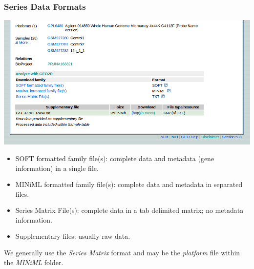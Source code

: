 \documentclass{beamer}
\begin{document}
\begin{frame}[allowframebreaks]
  \frametitle{Series Data Formats}
  
  \begin{center}
    \href{http://www.ncbi.nlm.nih.gov/geo/query/acc.cgi?acc=GSE37761}{\includegraphics[width=\linewidth]{geo_download_data1}}
  \end{center}

  \framebreak

  \begin{itemize}
  \item SOFT formatted family file(s): complete data and metadata (gene information) in a single file.
  \item MINiML formatted family file(s): complete data and metadata in separated files.
  \item Series Matrix File(s): complete data in a tab delimited matrix; no metadata information.

    \bigskip

  \item Supplementary files: usually raw data.
  \end{itemize}

  \bigskip

  We generally use the \textit{Series Matrix} format and may be the \textit{platform} file within the \textit{MINiML} folder.

\end{frame}

\end{document}
